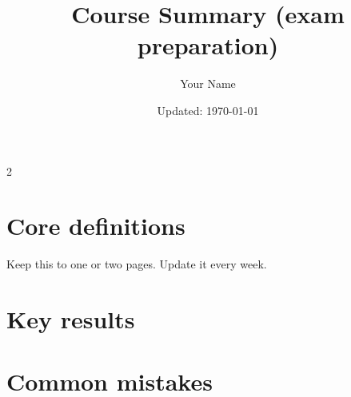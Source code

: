\documentclass[notes]{ituphd}
\title{Course Summary (exam preparation)}
\author{Your Name}
\date{Updated: \today}
\begin{document}
\maketitle
\small
\begin{multicols}{2}
\section*{Core definitions}
Keep this to one or two pages. Update it every week.
\section*{Key results}
\section*{Common mistakes}
\end{multicols}
\end{document}
